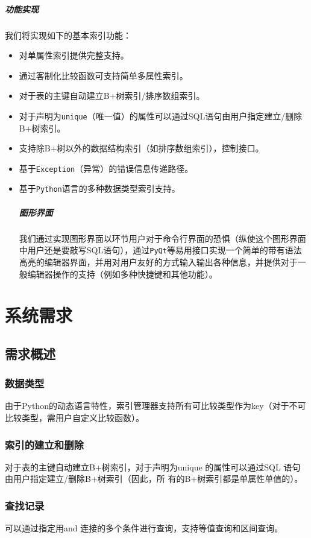 \documentclass[UTF8]{ctexrep} %
\begin{document}
\paragraph{功能实现}
我们将实现如下的基本索引功能：
\begin{itemize}
    \item 对单属性索引提供完整支持。
    \item 通过客制化比较函数可支持简单多属性索引。
    \item 对于表的主键自动建立B+树索引/排序数组索引。
    \item 对于声明为\texttt{unique}（唯一值）的属性可以通过SQL语句由用户指定建立/删除B+树索引。
    \item 支持除B+树以外的数据结构索引（如排序数组索引），控制接口。
    \item 基于\texttt{Exception}（异常）的错误信息传递路径。
    \item 基于\texttt{Python}语言的多种数据类型索引支持。
    
\paragraph{图形界面}
我们通过实现图形界面以环节用户对于命令行界面的恐惧（纵使这个图形界面中用户还是要敲写SQL语句），通过\texttt{PyQt}等易用接口实现一个简单的带有语法高亮的编辑器界面，并用对用户友好的方式输入输出各种信息，并提供对于一般编辑器操作的支持（例如多种快捷键和其他功能）。

\end{itemize}

\chapter{系统需求}
\section{需求概述}
\subsection{数据类型}
由于Python的动态语言特性，索引管理器支持所有可比较类型作为key（对于不可比较类型，需用户自定义比较函数）。
\subsection{索引的建立和删除}
对于表的主键自动建立B+树索引，对于声明为unique 的属性可以通过SQL 语句由用户指定建立/删除B+树索引（因此，所
有的B+树索引都是单属性单值的）。
\subsection{查找记录}
可以通过指定用and 连接的多个条件进行查询，支持等值查询和区间查询。
\end{document}
